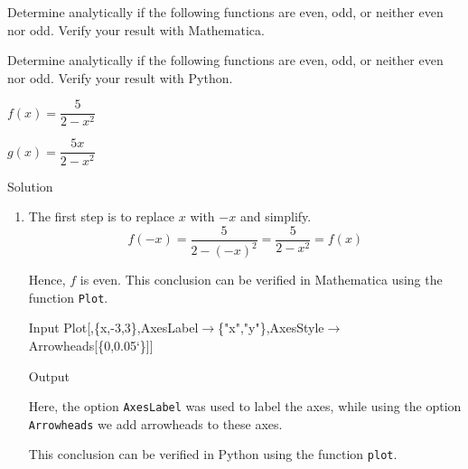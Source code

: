 \begin{example}
\ifmathematica
Determine analytically if the following functions are even, odd, or neither even nor odd.  \ifcourse Verify your result with Mathematica. \fi\fi

\ifpython
Determine analytically if the following functions are even, odd, or neither even nor odd.  \ifcourse Verify your result with Python. \fi\fi

\begin{enumerate}
\begin{multicols}{2}
\item  $f(x) = \dfrac{5}{2 - x^2}$ 
\item  $g(x) = \dfrac{5x}{2 - x^2}$  
\end{multicols}
\end{enumerate}


Solution 

\begin{enumerate}
\item The first step  is to replace $x$ with $-x$ and simplify.
$$
f(-x)  =  \dfrac{5}{2 - (-x)^2}=\dfrac{5}{2 - x^2}=f(x) 
$$

Hence, $f$ is even. \ifmathematica\ifcourse This conclusion can be verified in Mathematica using the function \lstinline{Plot}.
\begin{mdframed}[default,backgroundcolor=gray!40,roundcorner=8pt]
\begin{mmaCell}[morefunctionlocal={x}, moredefined={Arrowheads}]{Input}
  Plot[,\{x,-3,3\},AxesLabel\(\pmb{\to}\)\{"x","y"\},AxesStyle\(\pmb{\to}\)Arrowheads[\{0,0.05`\}]]

\end{mmaCell}


\begin{mmaCell}[moregraphics={moreig={scale=.4}}]{Output}
\end{mmaCell}
Here, the option \lstinline{AxesLabel} was used to label the axes, while using the option \lstinline{Arrowheads} we add arrowheads to these axes. 
\end{mdframed}
\fi
\fi

\ifpython\ifcourse This conclusion can be verified in Python using the function \lstinline{plot}.


\end{enumerate}
\end{example}
